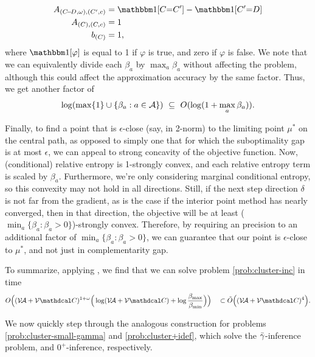 \begin{lproof}
\begin{align*}
        A_{(C\!{-}\!D, \omega),(C',c)} &= \mathbbm1[C{=}C'] - \mathbbm1[C'{=}D]\\
        A_{(C),(C,c)} &= 1 \\
        b_{(C)} &= 1,
    \end{align*}
    where $\mathbbm1[\varphi]$ is equal to 1 if $\varphi$ is true, and zero if $\varphi$ is false.
    We note that we can equivalently divide each $\beta_a$ by $\max_a \beta_a$ without affecting the problem, 
    although this could affect the approximation accuracy by the same factor. 
    Thus, we get another factor of 
    \[
        \log ( \max \{1 \} \cup \{ \beta_a : a \in \mathcal A\} ) ~\subseteq~ O( \log (1 + \max_a \beta_a ) ).
    \]
    
    Finally, to find a point that is $\epsilon$-close (say, in 2-norm) to the limiting point $\mu^*$ on the central path, as opposed to simply one that for which the suboptimality gap is at most $\epsilon$, we can appeal to strong concavity of the objective function. 
    Now, (conditional) relative entropy is 1-strongly convex, and each relative entropy term is scaled by $\beta_a$.
    Furthermore, we're only considering marginal conditional entropy, so this convexity may not hold in all directions.
    Still, if the next step direction $\delta$ is not far from the gradient, as is the case if the interior point method has nearly converged, then in that direction, the objective will be at least ($\min_a \{ \beta_a : \beta_a > 0\}$)-strongly convex. 
    Therefore, by requiring an precision to an additional factor of $\min_a \{ \beta_a : \beta_a > 0\}$, we can guarantee that our point is $\epsilon$-close to $\mu^*$, and not just in complementarity gap. 
    
    To summarize, applying , we find that we can solve problem \eqref{prob:cluster-inc} in time
    \begin{align*}
        O\Big( (\V\!\Ar + \V\C)^{1 + \omega} \Big( \log (\V\!\Ar + \V\C) + \log \frac{\beta_{\max}}{\beta_{\min}} \Big) \Big)
        \quad
        \subset \tilde O\Big( (\V\!\Ar + \V\C)^4 \Big).
    \end{align*}
\end{lproof}

We now quickly step through the analogous construction for problems \eqref{prob:cluster-small-gamma} and \eqref{prob:cluster+idef}, which
solve the ${\bar\gamma}$-inference problem, and $0^+$-inference, respectively.

